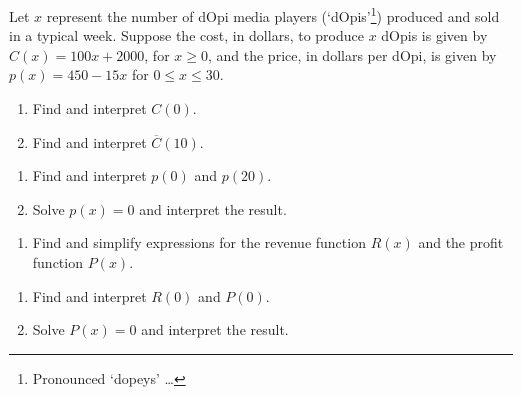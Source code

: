 \documentclass{ximera}
\begin{document}
\begin{example} \label{costrevenueprofitex1}  Let $x$ represent the number of dOpi media players (`dOpis'\footnote{Pronounced `dopeys' \ldots}) produced and sold in a typical week.  Suppose the cost, in dollars, to produce $x$ dOpis  is given by   $C(x) = 100x + 2000$, for $x \geq 0$, and the price, in dollars per dOpi, is given by $p(x) = 450-15x$ for $0 \leq x \leq 30$.

\begin{multicols}{2}
\begin{enumerate}

\item  Find and interpret $C(0)$.
\item  Find and interpret $\overline{C}(10)$.

\setcounter{HW}{\value{enumi}}
\end{enumerate}
\end{multicols}
\vspace{-.2in}
\begin{multicols}{2}
\begin{enumerate}
\setcounter{enumi}{\value{HW}}

\item  Find and interpret $p(0)$ and $p(20)$.
\item  Solve $p(x) = 0$ and interpret the result.

\setcounter{HW}{\value{enumi}}
\end{enumerate}
\end{multicols}
\vspace{-.2in}
\begin{enumerate}
\setcounter{enumi}{\value{HW}}

\item  Find and simplify expressions for the revenue function $R(x)$ and the profit function $P(x)$.

\setcounter{HW}{\value{enumi}}
\end{enumerate}
\enlargethispage{.3in} \vspace{-.2in}
\begin{multicols}{2}
\begin{enumerate}
\setcounter{enumi}{\value{HW}}

\item  Find and interpret $R(0)$ and $P(0)$.
\item  Solve $P(x) = 0$ and interpret the result.

\end{enumerate}
\end{multicols}


\end{example}
\end{document}

